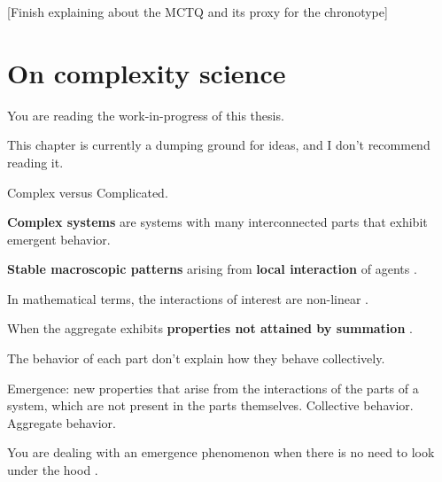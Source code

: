 \documentclass[
12pt,
openright,
oneside,
a4paper,
chapter=TITLE,
section=TITLE,
french,
spanish,
brazil,
english
]{abntex2}\usepackage{array}
\newcommand{\microskip}{\vspace{\microskipamount}}
\begin{document}
{[}Finish explaining about the MCTQ and its proxy for the chronotype{]}


\chapter{On complexity science}\label{on-complexity-science}

\begin{tcolorbox}[enhanced jigsaw, colframe=quarto-callout-important-color-frame, rightrule=.15mm, opacitybacktitle=0.6, toprule=.15mm, opacityback=0, toptitle=1mm, bottomtitle=1mm, breakable, leftrule=.75mm, title=\textcolor{quarto-callout-important-color}{\faExclamation}\hspace{0.5em}{Important}, coltitle=black, bottomrule=.15mm, arc=.35mm, titlerule=0mm, left=2mm, colback=white, colbacktitle=quarto-callout-important-color!10!white]

You are reading the work-in-progress of this thesis.

\microskip

This chapter is currently a dumping ground for ideas, and I don't
recommend reading it.

\end{tcolorbox}

Complex versus Complicated.

\textbf{Complex systems} are systems with many interconnected parts that
exhibit emergent behavior.

\textbf{Stable macroscopic patterns} arising from \textbf{local
interaction} of agents \autocite{epstein1999}.

In mathematical terms, the interactions of interest are non-linear
\autocite{holland2014}.

When the aggregate exhibits \textbf{properties not attained by
summation} \autocite{holland2014}.

The behavior of each part don't explain how they behave collectively.

Emergence: new properties that arise from the interactions of the parts
of a system, which are not present in the parts themselves. Collective
behavior. Aggregate behavior.

You are dealing with an emergence phenomenon when there is no need to
look under the hood \autocite{krakauer2023}.
\end{document}
